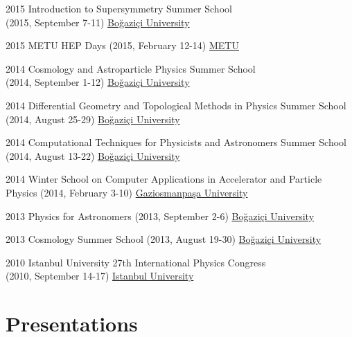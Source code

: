 \documentclass[]{friggeri-cv}
\begin{document}
\begin{entrylist}		 	
	\entry
	{2015}
	{Introduction to Supersymmetry  Summer School \\ \normalfont (2015, September 7-11)}
	{\href{http://fezagursey.boun.edu.tr/?sayfa=29}{Boğaziçi University}}
	
	\entry
	{2015}
	{METU HEP Days  \normalfont (2015, February 12-14)}
	{\href{http://yef.ankara.edu.tr/yefgunleri2015/index.html}{METU}}
	
	\entry
	{2014}
	{Cosmology and Astroparticle Physics Summer School \\ \normalfont (2014, September 1-12)}
	{\href{http://fezagursey.boun.edu.tr/?sayfa=33}{Boğaziçi University}}
	
	\entry
	{2014}
	{Differential Geometry and Topological Methods in Physics Summer School  \normalfont (2014, August 25-29)}
	{\href{http://fezagursey.boun.edu.tr/?sayfa=32}{Boğaziçi University}}
	
	\entry
	{2014}
	{Computational Techniques for Physicists and Astronomers Summer School  \normalfont (2014, August 13-22)}
	{\href{http://fezagursey.boun.edu.tr/?sayfa=31}{Boğaziçi University}}
	
	\entry
	{2014}
	{Winter School on Computer Applications in Accelerator and Particle Physics \normalfont (2014, February 3-10)}
	{\href{http://hpfbu.web.cern.ch/hpfbu/HPFBU2014/HPFBU2014.html}{Gaziosmanpaşa University}}
	
	\entry
	{2013}
	{Physics for Astronomers \normalfont (2013, September 2-6)}
	{\href{http://fezagursey.boun.edu.tr/?sayfa=36}{Boğaziçi University}}
	
	\entry
	{2013}
	{Cosmology Summer School \normalfont (2013, August 19-30)}
	{\href{http://fezagursey.boun.edu.tr/?sayfa=35}{Boğaziçi University}}
	
	\entry
	{2010}
	{Istanbul University 27th International Physics  Congress \\ \normalfont (2010, September 14-17)}
	{\href{http://www.tfd.com.tr/arsiv/TFD/27/Wc9f53756aa549.htm}{Istanbul University}}
	
\end{entrylist}

\newpage

\section{Presentations}
\end{document}
